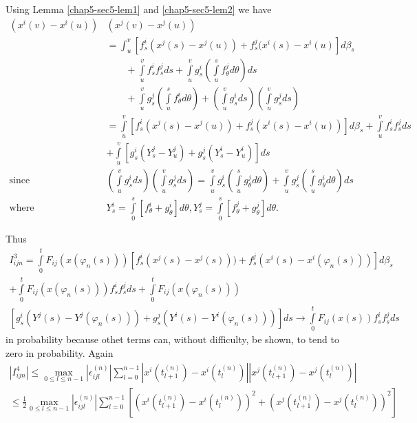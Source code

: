 \begin{pot*}
Using Lemma \ref{chap5-sec5-lem1} and \ref{chap5-sec5-lem2} we have 
{\fontsize{10pt}{12pt}\selectfont
\begin{align*}
 (x^i (v) - x^i (u))&  ( x^j (v) - x^j (u))\\
    & = \int^v _u \left[f^i_s
      (x^j (s) - x^j(u)) + f^j _s ( x^i (s) - x^i (u) \right] d
    \beta_s\\  
    &\qquad + \int\limits^v _u f^i_s f^j_s ds + \int\limits^v_u g^{i}_{s}
    \left(\int\limits^s_u f^j_\theta d\theta \right)ds\\
&\qquad +
    \int\limits^v_u g^j_s
    \left(\int\limits^{s}_{u}f^{i}_{\theta}d\theta\right)
     +\left(\int\limits^{v}_{u}g^{i}_{s}ds\right)\left(\int\limits^{v}_{u}g^{j}_{s}ds\right)\\ 
    & = \int\limits^v_u \left[f^i_s (x^j (s) - x^j (u)) + f^j_s (x^{i}(s)
      - x^i (u))\right] d \beta_s + \int\limits^v_u f^i_s f^j_s
    ds\\ 
    & + \int\limits^v_u \left[g^i_s (Y^j_s - Y^j_u) + g^j_s
      (Y^i_s - Y^i_u) \right] ds\\ 
     \text{since\ } & \left( \int\limits^v_u g^i_s ds \right) 
\left(\int\limits^{v}_{u}g^{j}_{s}ds\right)
 =   \int\limits^v_u g_s^i \left(\int\limits^s_u g^j_\theta d\theta\right)
      + \int\limits^v_u g_s^j \left(\int\limits^s_u g^i_{\theta}
      d\theta\right) ds \\ 
      \text{where } \qquad & Y^i_s  = \int\limits^s_0 
\left[f^i_\theta + g^i_\theta \right] d\theta, Y^{j}_{s} = \int\limits^s_0 \left[ f^j_\theta + g^j_\theta \right] d \theta.  
  \end{align*}}\relax\pageoriginale

Thus 
{\fontsize{10pt}{12pt}\selectfont
\begin{multline*}
I^3_{ijn} = \int\limits^t_0 F_{ij}(x(\varphi_n (s))) \left[
      f^i_s (x^j (s) - x^j (s))) + f^j_s (x^i(s)-x^{i} (\varphi_n (s)))
      \right]d\beta_{s} \\
    + \int\limits^t_0 F_{ij} (x(\varphi_n(s))) f^i_s
    f^j_s ds + \int\limits^t_0 F_{ij} (x(\varphi_n(s)))\\ 
    \left[ g^i _s (
      Y^j (s) - Y^j ( \varphi _n (s))) + g^j_s (Y^i (s) - Y^i (
      \varphi _n (s)))\right] ds \to \int\limits^t_0 F_{ij} (x(s)) f^i_s
    f^j_s ds
  \end{multline*}}\relax
in probability because othet terms can, without
  difficulty, be shown, to tend to zero in probability. Again  
\begin{multline*}
 | I^4_{ijn}| \leq \max_{0 \leq l\leq n - 1} | \epsilon^{(n)}_{ijl}|
    \sum^{n-1}_{l=0} |x^i(t_{l+1}^{(n)})-x^{i}(t^{(n)}_{l}) || x^j
    (t_{l + 1}^{(n)}) - x^j (t_l^{(n)})|\\ 
    \leq \frac{1}{2} \max_{0 \leq l \leq n - 1} | \epsilon^{(n)}_{ijl}|
    \sum^{n-1}_{l=0} \left[\left(x^i(t_{l+1}^{(n)}) - x^i
      (t^{(n)}_{l})\right)^2 + \left(x^j
      (t^{(n)}_{l+1})-x^{j}(t^{(n)}_{l})\right)^2 \right]  
  \end{multline*}


\end{pot*}
